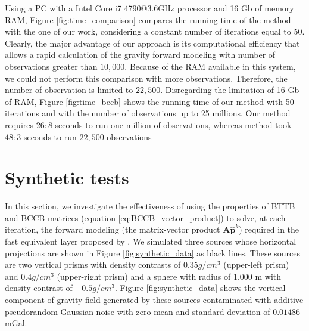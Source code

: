 \documentclass[manuscript,revised]{geophysics}
\begin{document}
Using a PC with a Intel Core i7 4790@3.6GHz processor and 16 Gb of memory RAM, Figure \ref{fig:time_comparison}  compares the running time  of the  \citet{siqueira-etal2017} method with the one of our work, considering a constant number of iterations equal to 50. Clearly, the major advantage of our approach is its computational efficiency that allows a rapid calculation of the gravity forward modeling  with number of observations greater than $10,000$. Because of the RAM available in this system, we could not perform this comparison with more observations. Therefore, the number of observation is limited to $22,500$. Disregarding the limitation of 16 Gb of RAM, Figure \ref{fig:time_bccb} shows the running time of our method with 50 iterations and with the number of observations up to  25 millions. Our method requires $26:8$ seconds to run one million of observations, whereas \citet{siqueira-etal2017} method took $48:3$ seconds to run $22,500$ observations


\section{Synthetic tests}
In this section, we  investigate the effectiveness of using the properties of BTTB and BCCB matrices (equation \ref{eq:BCCB_vector_product})  to solve, at each iteration, the forward modeling (the matrix-vector product $\mathbf{A} \hat{\mathbf{p}}^k$)  required in the fast equivalent layer proposed by \citet{siqueira-etal2017}.  We simulated three sources whose horizontal projections are shown in Figure \ref{fig:synthetic_data} as black lines.  These sources are two vertical prisms with density contrasts of $0.35 g/cm^3$ (upper-left prism) and $0.4 g/cm^3$ (upper-right prism) and a sphere with radius of 1,000 m with density contrast of $-0.5 g/cm^3$. Figure \ref{fig:synthetic_data}  shows the vertical component of gravity field generated by these sources contaminated with additive pseudorandom Gaussian noise with zero mean and standard deviation of $0.01486$ mGal.
 
\end{document}
